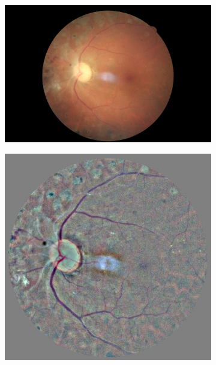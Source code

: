 \begin{figure}[tb]
\begin{subfigure}[b]{0.24\textwidth}
    \end{subfigure}
    \hfill
    \begin{subfigure}[b]{0.24\textwidth}
        \centering
        \includegraphics[width=\textwidth, height=\textwidth]{figures/chapter4/Preprocessing/Ori/294_left.jpeg}
    \end{subfigure}
    \hfill
    \begin{subfigure}[b]{0.24\textwidth}
        \centering
        \includegraphics[width=\textwidth, height=\textwidth]{figures/chapter4/Preprocessing/Prep/294_left.jpeg}
     \end{subfigure}


\end{figure}
